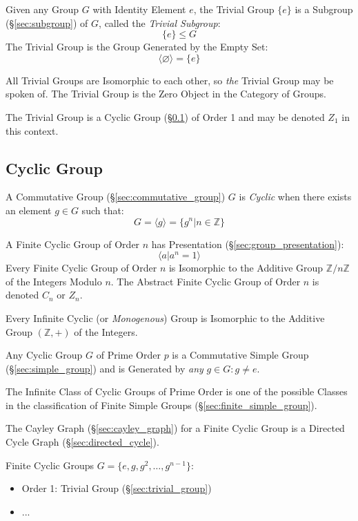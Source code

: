 Given any Group $G$ with Identity Element $e$, the Trivial Group $\{e\}$ is a
Subgroup (\S\ref{sec:subgroup}) of $G$, called the \emph{Trivial Subgroup}:
\[
    \{e\} \leq G
\]
The Trivial Group is the Group Generated by the Empty Set:
\[
  \langle{\varnothing}\rangle = \{ e \}
\]

All Trivial Groups are Isomorphic to each other, so \emph{the} Trivial Group may
be spoken of. The Trivial Group is the Zero Object in the Category of Groups.

The Trivial Group is a Cyclic Group (\S\ref{sec:cyclic_group}) of Order 1 and
may be denoted $Z_1$ in this context.



\subsection{Cyclic Group}\label{sec:cyclic_group}

A Commutative Group (\S\ref{sec:commutative_group}) $G$ is \emph{Cyclic} when
there exists an element $g \in G$ such that:
\[
    G = \langle{g}\rangle = \{ g^n | n \in \mathbb{Z} \}
\]

A Finite Cyclic Group of Order $n$ has Presentation
(\S\ref{sec:group_presentation}):
\[
  \langle{a | a^n = 1}\rangle
\]
Every Finite Cyclic Group of Order $n$ is Isomorphic to the Additive Group
$\mathbb{Z}/n\mathbb{Z}$ of the Integers Modulo $n$. The Abstract Finite Cyclic
Group of Order $n$ is denoted $C_n$ or $Z_n$.

Every Infinite Cyclic (or \emph{Monogenous}) Group is Isomorphic to the Additive
Group $(\mathbb{Z}, +)$ of the Integers.

Any Cyclic Group $G$ of Prime Order $p$ is a Commutative Simple Group
(\S\ref{sec:simple_group}) and is Generated by \emph{any} $g \in G : g \neq e$.

The Infinite Class of Cyclic Groups of Prime Order is one of the possible
Classes in the classification of Finite Simple Groups
(\S\ref{sec:finite_simple_group}).

The Cayley Graph (\S\ref{sec:cayley_graph}) for a Finite Cyclic Group is a
Directed Cycle Graph (\S\ref{sec:directed_cycle}).

Finite Cyclic Groups $G = \{ e, g, g^2, \ldots, g^{n-1} \}$:
\begin{itemize}
  \item Order 1: Trivial Group (\S\ref{sec:trivial_group})
  \item ...
\end{itemize}

